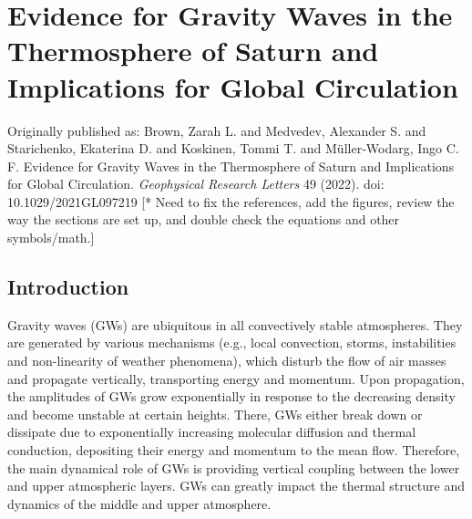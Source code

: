 \chapter{Evidence for Gravity Waves in the Thermosphere of Saturn and Implications for Global Circulation} 
\thispagestyle{fancy} 

Originally published as: Brown, Zarah L. and Medvedev, Alexander S. and Starichenko, Ekaterina D. and Koskinen, Tommi T. and M\"{u}ller‐Wodarg, Ingo C. F. Evidence for Gravity Waves in the Thermosphere of Saturn and Implications for Global Circulation. \textit{Geophysical Research Letters} 49 (2022). doi: 10.1029/2021GL097219
[* Need to fix the references, add the figures, review the way the sections are set up, and double check the equations and other symbols/math.]


\section{Introduction}
\label{sec:intro}

Gravity waves (GWs) are ubiquitous in all convectively stable atmospheres. They are generated by various mechanisms (e.g., local convection, storms, instabilities and non-linearity of weather phenomena), which disturb the flow of air masses and propagate vertically, transporting energy and momentum. Upon propagation, the amplitudes of GWs grow exponentially in response to the decreasing density and become unstable at certain heights. There, GWs either break down or dissipate due to exponentially increasing molecular diffusion and thermal conduction, depositing their energy and momentum to the mean flow. Therefore, the main dynamical role of GWs is providing vertical coupling between the lower and upper atmospheric layers. GWs can greatly impact the thermal structure and dynamics of the middle and upper atmosphere.


